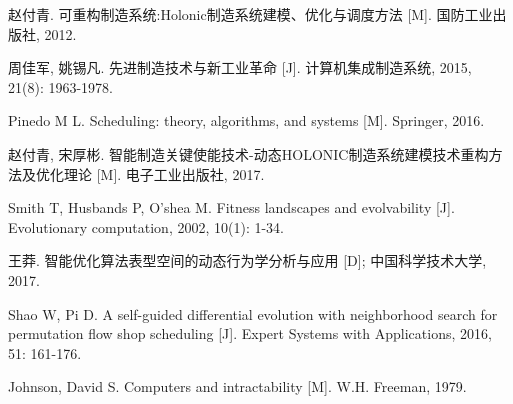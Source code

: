 \begin{references}
  \begin{publications}[itemsep=0.5ex,partopsep=0pt,parsep=0ex,topsep=0bp,labelsep=6pt,listparindent=0pt]
\item 赵付青. 可重构制造系统:Holonic制造系统建模、优化与调度方法 [M]. 国防工业出版社, 2012.
\item 周佳军, 姚锡凡. 先进制造技术与新工业革命 [J]. 计算机集成制造系统, 2015, 21(8): 1963-1978.
\item Pinedo M L. Scheduling: theory, algorithms, and systems [M]. Springer, 2016.
\item 赵付青, 宋厚彬. 智能制造关键使能技术-动态HOLONIC制造系统建模技术重构方法及优化理论 [M]. 电子工业出版社, 2017.
\item Smith T, Husbands P, O'shea M. Fitness landscapes and evolvability [J]. Evolutionary computation, 2002, 10(1): 1-34.
\item 王莽. 智能优化算法表型空间的动态行为学分析与应用 [D]; 中国科学技术大学, 2017.
\item Shao W, Pi D. A self-guided differential evolution with neighborhood search for permutation flow shop scheduling [J]. Expert Systems with Applications, 2016, 51: 161-176.
\item Johnson, David S. Computers and intractability [M]. W.H. Freeman, 1979.
	\end{publications}
\end{references}

